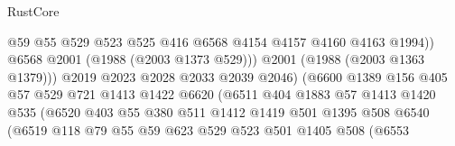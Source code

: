 \begin{lexlean}{RustCore}
\begin{coremodule}
                                        @59
                                        @55
                                        @529
                                        @523
                                        @525
                                        @416
                                        @6568
                                        @4154
                                        @4157
                                        @4160
                                        @4163
                                        @1994))
                                    @6568
                                    @2001
                                    (@1988 (@2003 @1373 @529)))
                                  @2001
                                  (@1988 (@2003 @1363 @1379)))
                                @2019
                                @2023
                                @2028
                                @2033
                                @2039
                                @2046)
                              (@6600
                                @1389
                                @156
                                @405
                                @57
                                @529
                                @721
                                @1413
                                @1422
                                @6620
                                (@6511
                                  @404
                                  @1883
                                  @57
                                  @1413
                                  @1420
                                  @535
                                  (@6520
                                    @403
                                    @55
                                    @380
                                    @511
                                    @1412
                                    @1419
                                    @501
                                    @1395
                                    @508
                                    @6540
                                    (@6519
                                      @118
                                      @79
                                      @55
                                      @59
                                      @623
                                      @529
                                      @523
                                      @501
                                      @1405
                                      @508
                                      (@6553

\end{coremodule}
\end{lexlean}
